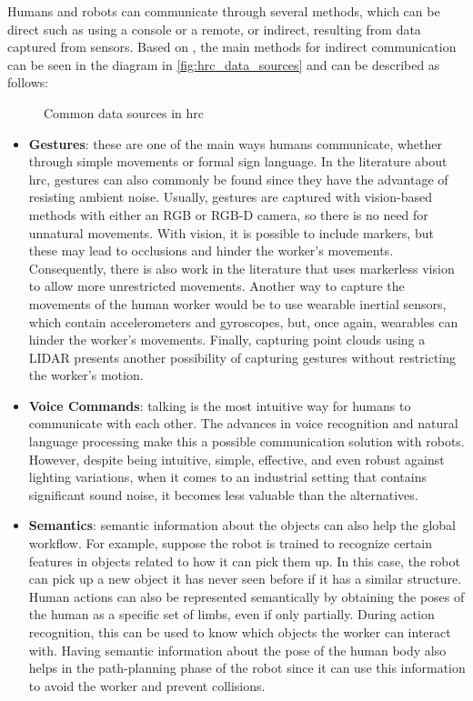 Humans and robots can communicate through several methods, which can be direct such as using a console or a remote, or indirect, resulting from data captured from sensors. Based on \cite{Castro2021, Mukherjee2022, Semeraro2023}, the main methods for indirect communication can be seen in the diagram in \autoref{fig:hrc_data_sources} and can be described as follows:
\begin{figure}[ht]
    \centering
     
    \caption{Common data sources in \acl{hrc}}
    \label{fig:hrc_data_sources}
\end{figure}
\begin{itemize}
\item \textbf{Gestures}: these are one of the main ways humans communicate, whether through simple movements or formal sign language. In the literature about \acs{hrc}, gestures can also commonly be found since they have the advantage of resisting ambient noise. Usually, gestures are captured with vision-based methods with either an RGB or RGB-D camera, so there is no need for unnatural movements. With vision, it is possible to include markers, but these may lead to occlusions and hinder the worker's movements. Consequently, there is also work in the literature that uses markerless vision to allow more unrestricted movements. Another way to capture the movements of the human worker would be to use wearable inertial sensors, which contain accelerometers and gyroscopes, but, once again, wearables can hinder the worker's movements. Finally, capturing point clouds using a LIDAR presents another possibility of capturing gestures without restricting the worker's motion.


\item \textbf{Voice Commands}: talking is the most intuitive way for humans to communicate with each other. The advances in voice recognition and natural language processing make this a possible communication solution with robots. However, despite being intuitive, simple, effective, and even robust against lighting variations, when it comes to an industrial setting that contains significant sound noise, it becomes less valuable than the alternatives.

\item \textbf{Semantics}: semantic information about the objects can also help the global workflow. For example, suppose the robot is trained to recognize certain features in objects related to how it can pick them up. In this case, the robot can pick up a new object it has never seen before if it has a similar structure. Human actions can also be represented semantically by obtaining the poses of the human as a specific set of limbs, even if only partially. During action recognition, this can be used to know which objects the worker can interact with. Having semantic information about the pose of the human body also helps in the path-planning phase of the robot since it can use this information to avoid the worker and prevent collisions.


\end{itemize}
